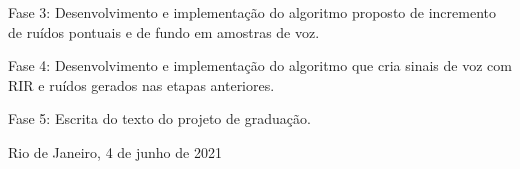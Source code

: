 \documentclass[a4paper,12pt,oneside,openany]{report}
\begin{document}
Fase 3: Desenvolvimento e implementação do algoritmo proposto \cite{Speech_Rec} de incremento de ruídos pontuais e de fundo em amostras de voz.

Fase 4: Desenvolvimento e implementação do algoritmo que cria sinais de voz com RIR e ruídos gerados nas etapas anteriores.

Fase 5: Escrita do texto do projeto de graduação.


 


\vspace{2cm}
\noindent
Rio de Janeiro, 4 de junho de 2021

\vspace{0.5cm}
\begin{flushright}
      \parbox{10cm}{
      \hrulefill

      \vspace{-.375cm}

      \vspace{0.9cm}
      \hrulefill

      \vspace{-.375cm}

      \vspace{0.9cm}
      }
\end{flushright}
\vfill
      
\end{document}

